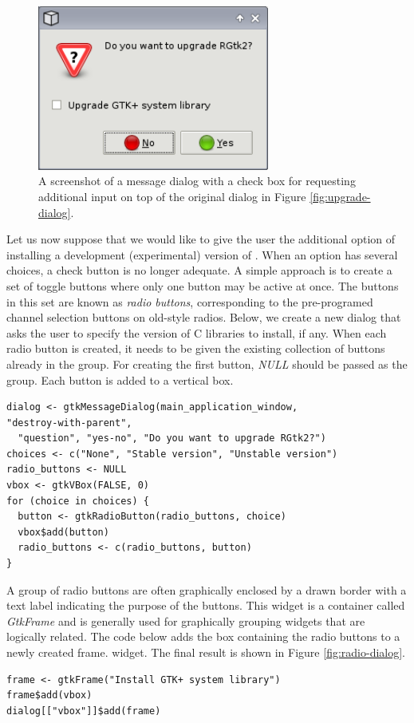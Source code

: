 \documentclass[article]{jss}
\begin{document}
\begin{figure}
\begin{center}
\includegraphics[width=3in]{checkbox-dialog.png}
\caption{\label{fig:checkbox-dialog}A screenshot of a message dialog
with a 
check box for requesting additional input on top of the
original dialog in Figure \ref{fig:upgrade-dialog}.}
\end{center}
\end{figure}

Let us now suppose that we would like to give the user the additional
option of installing a development (experimental) version of
.  When an option has several choices, a check button is no
longer adequate. A simple approach is to create a set of toggle
buttons where only one button may be active at once. The buttons in
this set are known as \emph{radio buttons}, corresponding to the
pre-programed channel selection buttons on old-style radios.  Below,
we create a new dialog that asks the user to specify the version of
 C libraries to install, if any. When each radio button is created, it
needs to be given the existing collection of buttons already in the
group. For creating the first button, \emph{NULL} should be passed as
the group.  Each button is added to a vertical box.
\begin{verbatim}
dialog <- gtkMessageDialog(main_application_window,
"destroy-with-parent", 
  "question", "yes-no", "Do you want to upgrade RGtk2?")
choices <- c("None", "Stable version", "Unstable version")
radio_buttons <- NULL
vbox <- gtkVBox(FALSE, 0)
for (choice in choices) {
  button <- gtkRadioButton(radio_buttons, choice)
  vbox$add(button)
  radio_buttons <- c(radio_buttons, button)
}
\end{verbatim}
A group of radio buttons are often graphically enclosed by a drawn
border with a text label indicating the purpose of the buttons. This
widget is a container called \emph{GtkFrame} and is generally used for
graphically grouping widgets that are logically related. The code
below adds the box containing the radio buttons to a newly created frame.
widget.
The final result is shown in Figure \ref{fig:radio-dialog}.
\begin{verbatim}
frame <- gtkFrame("Install GTK+ system library")
frame$add(vbox)
dialog[["vbox"]]$add(frame)
\end{verbatim}
\end{document}
